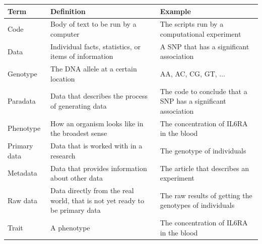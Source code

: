 \begin{table}[h]
  \begin{tabular}{lp{5cm}p{5cm}}
    Term      & Definition                                            & Example                                                         \\
    \hline
    Code      & Body of text to be run by a computer                  & The scripts run by a computational experiment                   \\
    Data      & Individual facts, statistics, or items of information & A SNP that has a significant association                        \\
    Genotype  & The DNA allele at a certain location                  & AA, AC, CG, GT, ...                                             \\
    Paradata  & Data that describes the process of generating data    & The code to conclude that a SNP has a significant association   \\
    Phenotype & How an organism looks like in the broadest sense      & The concentration of IL6RA in the blood                         \\
    Primary data & Data that is worked with in a research             & The genotype of individuals   \\
    Metadata  & Data that provides information about other data       & The article that describes an experiment                        \\
    Raw data  & Data directly from the real world, that is not yet ready to be primary data & The raw results of getting the genotypes of individuals   \\
    Trait     & A phenotype                                           & The concentration of IL6RA in the blood                         
  \end{tabular}
\end{table}
